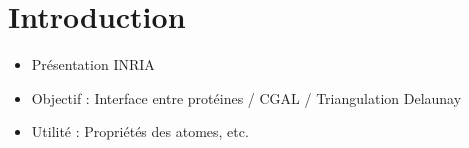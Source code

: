 \chapter*{Introduction}

\begin{itemize}
  \item Présentation INRIA
  \item Objectif : Interface entre protéines / CGAL / Triangulation Delaunay
  \item Utilité : Propriétés des atomes, etc.
\end{itemize}
